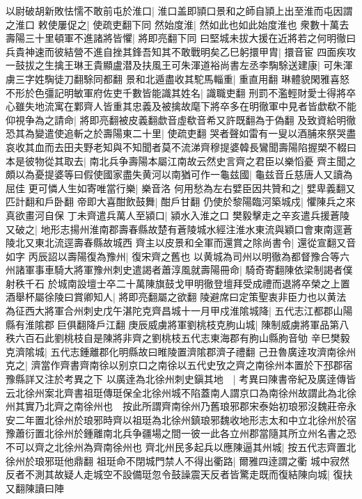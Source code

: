 以尉破胡新敗怯懦不敢前屯於淮口|{
	淮口盖即頴口景和之師自頴上出至淮而屯因謂之淮口}
敕使屢促之|{
	使疏吏翻下同}
然始度淮|{
	然如此也如此始度淮也}
衆數十萬去壽陽三十里頓軍不進諸將皆懼|{
	將即亮翻下同}
曰堅城未拔大援在近將若之何明徹曰兵貴神速而彼結營不進自挫其鋒吾知其不敢戰明矣乙巳躬擐甲胄|{
	擐音宦}
四面疾攻一鼓拔之生擒王琳王貴顯盧潜及扶風王可朱渾道裕尚書左丞李騊駼送建康|{
	可朱渾虜三字姓騊徒刀翻駼同都翻}
景和北遁盡收其駝馬輜重|{
	重直用翻}
琳體貌閑雅喜怒不形於色彊記明敏軍府佐吏千數皆能識其姓名|{
	識職吏翻}
刑罰不濫輕財愛士得將卒心雖失地流寓在鄴齊人皆重其忠義及被擒故麾下將卒多在明徹軍中見者皆歔欷不能仰視争為之請命|{
	將即亮翻被皮義翻歔音虛欷音希又許既翻為于偽翻}
及致資給明徹恐其為變遣使追斬之於壽陽東二十里|{
	使疏吏翻}
哭者聲如雷有一叟以酒脯來祭哭盡哀收其血而去田夫野老知與不知聞者莫不流涕齊穆提婆韓長鸞聞壽陽陷握槊不輟曰本是彼物從其取去|{
	南北兵争壽陽本屬江南故云然史言齊之君臣以樂慆憂}
齊主聞之頗以為憂提婆等曰假使國家盡失黄河以南猶可作一龜兹國|{
	龜兹音丘慈唐人又讀為屈佳}
更可憐人生如寄唯當行樂|{
	樂音洛}
何用愁為左右嬖臣因共贊和之|{
	嬖卑義翻又匹計翻和戶卧翻}
帝即大喜酣飲鼓舞|{
	酣戶甘翻}
仍使於黎陽臨河築城戍|{
	懼陳兵之來真欲畫河自保}
丁未齊遣兵萬人至潁口|{
	潁水入淮之口}
樊毅擊走之辛亥遣兵援蒼陵又破之|{
	地形志揚州淮南郡壽春縣故楚有蒼陵城水經注淮水東流與穎口會東南逕蒼陵北又東北流逕壽春縣故城西}
齊主以皮景和全軍而還賞之除尚書令|{
	還從宣翻又音如字}
丙辰詔以壽陽復為豫州|{
	復宋齊之舊也}
以黄城為司州以明徹為都督豫合等六州諸軍事車騎大將軍豫州刺史遣謁者蕭淳風就壽陽冊命|{
	騎奇寄翻陳依梁制謁者僕射秩千石}
於城南設壇士卒二十萬陳旗鼓戈甲明徹登壇拜受成禮而退將卒榮之上置酒舉杯屬徐陵曰賞卿知人|{
	將即亮翻屬之欲翻}
陵避席曰定策聖衷非臣力也以黄法為征西大將軍合州刺史戊午湛陀克齊昌城十一月甲戍淮隂城降|{
	五代志江都郡山陽縣有淮隂郡巨俱翻降戶江翻}
庚辰威虜將軍劉桃枝克朐山城|{
	陳制威虜將軍品第八秩六百石此劉桃枝自是陳將非齊之劉桃枝五代志東海郡有朐山縣朐音劬}
辛巳樊毅克濟隂城|{
	五代志鍾離郡化明縣故曰睢陵置濟隂郡濟子禮翻}
己丑魯廣逹攻濟南徐州克之|{
	濟當作齊書齊南徐以别京口之南徐以五代史攷之齊之南徐州本置於下邳郡宿豫縣詳又注於考異之下}
以廣逹為北徐州刺史鎭其地　|{
	考異曰陳書帝紀及廣逹傳皆云北徐州案北齊書祖珽傳珽保全北徐州城不陷蓋南人謂京口為南徐州故謂此為北徐州其實乃北齊之南徐州也　按此所謂齊南徐州乃舊琅邪郡宋泰始初琅邪沒魏莊帝永安二年置北徐州於琅邪時齊以祖珽為北徐州鎮琅邪魏收地形志太和中立北徐州於宿豫蕭衍置北徐州於鍾離南北兵争疆場之間一彼一此各立州郡當隨其所立州名書之恐不可以齊之北徐州為齊南徐州也}
齊北州民多起兵以應陳逼其州城|{
	按五代志齊置北徐州於琅邪珽他鼎翻}
祖珽命不閉城門禁人不得出衢路|{
	爾雅四逹謂之衢}
城中寂然反者不測其故疑人走城空不設備珽忽令鼓譟震天反者皆驚走既而復結陳向城|{
	復扶又翻陳讀曰陣}
